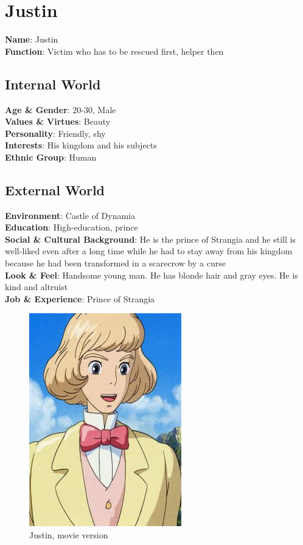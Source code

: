 \section{Justin}

\begin{minipage}{0.5\textwidth}
\textbf{Name}: Justin \\
\textbf{Function}: Victim who has to be rescued first, helper then

\subsection{Internal World}

\textbf{Age \& Gender}: 20-30, Male \\
\textbf{Values \& Virtues}: Beauty \\
\textbf{Personality}: Friendly, shy \\
\textbf{Interests}: His kingdom and his subjects \\
\textbf{Ethnic Group}: Human

\subsection{External World}
\textbf{Environment}: Castle of Dynamia \\
\textbf{Education}: High-education, prince \\
\textbf{Social \& Cultural Background}: He is the prince of Strangia and he still is well-liked even after a long time while he had to stay away from his kingdom because he had been transformed in a scarecrow by a curse \\
\textbf{Look \& Feel}: Handsome young man. He has blonde hair and gray eyes. He is kind and altruist \\
\textbf{Job \& Experience}: Prince of Strangia \\

\end{minipage}%
%
\hfill\begin{minipage}{0.4\textwidth}
  \begin{figure}[H]
  \includegraphics{Images/Characters/justin_portrait}
  \caption{Justin, movie version }
\end{figure}
\end{minipage}

